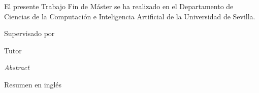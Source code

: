 \documentclass[a4paper,12pt,twoside]{book}
\theoremstyle{definition}
\begin{document}
\begin{titlepage}
  \newpage


  
  \begin{center}
   \vspace*{5cm}
    \begin{minipage}{14cm}
      El presente Trabajo Fin de Máster se ha realizado en el Departamento de
      Ciencias de la Computación e Inteligencia Artificial de la Universidad de
      Sevilla.

      \vspace*{7.5mm}

      Supervisado por
    \end{minipage}\par
    Tutor
    \end{center}
  \vspace*{\fill}

  \newpage

  \vspace*{3cm}
  {\huge \textit{Abstract}}

  \vspace{2cm}
  Resumen en inglés
  
\end{titlepage}
\newpage


\newpage 

\tableofcontents
\newpage













\printindex


\end{document}
